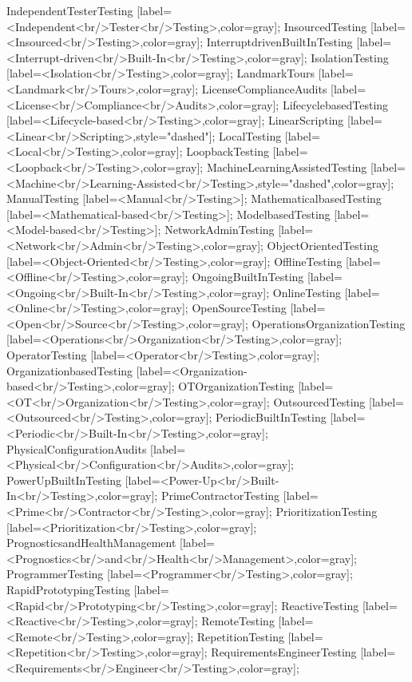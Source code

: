 \documentclass{article}
\begin{document}
{IndependentTesterTesting [label=<Independent<br/>Tester<br/>Testing>,color=gray];
InsourcedTesting [label=<Insourced<br/>Testing>,color=gray];
InterruptdrivenBuiltInTesting [label=<Interrupt-driven<br/>Built-In<br/>Testing>,color=gray];
IsolationTesting [label=<Isolation<br/>Testing>,color=gray];
LandmarkTours [label=<Landmark<br/>Tours>,color=gray];
LicenseComplianceAudits [label=<License<br/>Compliance<br/>Audits>,color=gray];
LifecyclebasedTesting [label=<Lifecycle-based<br/>Testing>,color=gray];
LinearScripting [label=<Linear<br/>Scripting>,style="dashed"];
LocalTesting [label=<Local<br/>Testing>,color=gray];
LoopbackTesting [label=<Loopback<br/>Testing>,color=gray];
MachineLearningAssistedTesting [label=<Machine<br/>Learning-Assisted<br/>Testing>,style="dashed",color=gray];
ManualTesting [label=<Manual<br/>Testing>];
MathematicalbasedTesting [label=<Mathematical-based<br/>Testing>];
ModelbasedTesting [label=<Model-based<br/>Testing>];
NetworkAdminTesting [label=<Network<br/>Admin<br/>Testing>,color=gray];
ObjectOrientedTesting [label=<Object-Oriented<br/>Testing>,color=gray];
OfflineTesting [label=<Offline<br/>Testing>,color=gray];
OngoingBuiltInTesting [label=<Ongoing<br/>Built-In<br/>Testing>,color=gray];
OnlineTesting [label=<Online<br/>Testing>,color=gray];
OpenSourceTesting [label=<Open<br/>Source<br/>Testing>,color=gray];
OperationsOrganizationTesting [label=<Operations<br/>Organization<br/>Testing>,color=gray];
OperatorTesting [label=<Operator<br/>Testing>,color=gray];
OrganizationbasedTesting [label=<Organization-based<br/>Testing>,color=gray];
OTOrganizationTesting [label=<OT<br/>Organization<br/>Testing>,color=gray];
OutsourcedTesting [label=<Outsourced<br/>Testing>,color=gray];
PeriodicBuiltInTesting [label=<Periodic<br/>Built-In<br/>Testing>,color=gray];
PhysicalConfigurationAudits [label=<Physical<br/>Configuration<br/>Audits>,color=gray];
PowerUpBuiltInTesting [label=<Power-Up<br/>Built-In<br/>Testing>,color=gray];
PrimeContractorTesting [label=<Prime<br/>Contractor<br/>Testing>,color=gray];
PrioritizationTesting [label=<Prioritization<br/>Testing>,color=gray];
PrognosticsandHealthManagement [label=<Prognostics<br/>and<br/>Health<br/>Management>,color=gray];
ProgrammerTesting [label=<Programmer<br/>Testing>,color=gray];
RapidPrototypingTesting [label=<Rapid<br/>Prototyping<br/>Testing>,color=gray];
ReactiveTesting [label=<Reactive<br/>Testing>,color=gray];
RemoteTesting [label=<Remote<br/>Testing>,color=gray];
RepetitionTesting [label=<Repetition<br/>Testing>,color=gray];
RequirementsEngineerTesting [label=<Requirements<br/>Engineer<br/>Testing>,color=gray];
}
\end{document}
